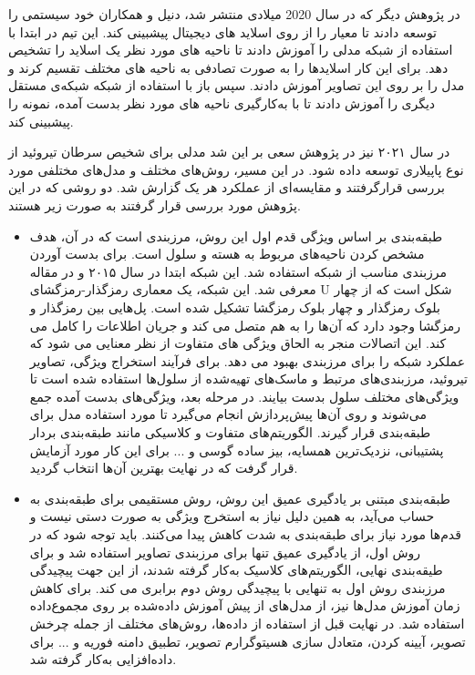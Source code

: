 در پژوهش دیگر \cite{elliott2020application} که در سال 2020 میلادی منتشر شد، دنیل و همکاران خود سیستمی را توسعه دادند تا معیار  را از روی اسلاید های دیجیتال پیشبینی کند. این تیم در ابتدا با استفاده از شبکه  مدلی را آموزش دادند تا ناحیه های مورد نظر یک اسلاید را تشخیص دهد. برای این کار اسلایدها را به صورت تصادفی به ناحیه های مختلف تقسیم کرند و مدل را بر روی این تصاویر آموزش دادند.
سپس باز با استفاده از شبکه  شبکه‌ی مستقل دیگری را آموزش دادند تا با به‌کارگیری ناحیه های مورد نظر بدست آمده،  نمونه را پیشبینی کند.



در سال ۲۰۲۱ نیز در پژوهش \cite{bohland2021machine} سعی بر این شد مدلی برای شخیص سرطان تیروئید از نوع پاپیلاری توسعه داده شود.
در این مسیر، روش‌های مختلف و مدل‌های مختلفی مورد بررسی قرارگرفتند و مقایسه‌ای از عملکرد هر یک گزارش شد.
دو روشی که در این پژوهش مورد بررسی قرار گرفتند به صورت زیر هستند.
\begin{itemize}
    \item طبقه‌بندی بر اساس ویژگی\newline
    قدم اول این روش، مرزبندی است که در آن، هدف مشخص کردن ناحیه‌های مربوط به هسته و سلول است.
    برای بدست آوردن مرزبندی مناسب از شبکه  استفاده شد. این شبکه ابتدا در سال ۲۰۱۵ و در مقاله \cite{ronneberger2015u} معرفی شد.
    این شبکه، یک معماری رمزگذار-رمزگشای U شکل است که از چهار بلوک رمزگذار و چهار بلوک رمزگشا تشکیل شده است.
    پل‌هایی بین رمزگذار و رمزگشا وجود دارد که آن‌ها را به هم متصل می کند و جریان اطلاعات را کامل می کند.
    این اتصالات منجر به الحاق ویژگی های متفاوت از نظر معنایی می شود که عملکرد شبکه را برای مرزبندی بهبود می دهد.
    برای فرآیند استخراج ویژگی، تصاویر تیروئید، مرزبندی‌های مرتبط و ماسک‌های تهیه‌شده از سلول‌ها استفاده شده است تا ویژگی‌های مختلف سلول بدست بیایند.
    در مرحله بعد، ویژگی‌های بدست آمده جمع می‌شوند و روی آن‌ها پیش‌پردازش انجام می‌گیرد تا مورد استفاده مدل برای طبقه‌بندی قرار گیرند. الگوریتم‌های متفاوت و کلاسیکی مانند طبقه‌بندی بردار پشتیبانی، نزدیک‌ترین همسایه، بیز ساده گوسی و ... برای این کار مورد آزمایش قرار گرفت که در نهایت بهترین آن‌ها انتخاب گردید.

    \item طبقه‌بندی مبتنی بر یادگیری عمیق\newline
    این روش، روش مستقیمی برای طبقه‌بندی به حساب می‌آید، به همین دلیل نیاز به استخرج ویژگی به صورت دستی نیست و قدم‌ها مورد نیاز برای طبقه‌بندی به شدت کاهش پیدا می‌کنند.
    باید توجه شود که در روش اول، از یادگیری عمیق تنها برای مرزبندی تصاویر استفاده شد و برای طیقه‌بندی نهایی، الگوریتم‌های کلاسیک به‌کار گرفته شدند، از این جهت پیچیدگی مرزبندی روش اول به تنهایی با پیچیدگی روش دوم برابری می کند.
    برای کاهش زمان آموزش مدل‌ها نیز، از مدل‌های از پیش آموزش داده‌شده بر روی مجموع‌داده \cite{deng2009imagenet} استفاده شد. در نهایت قبل از استفاده از داده‌ها، روش‌های مختلف از جمله چرخش تصویر، آیینه کردن، متعادل سازی هسیتوگرارم تصویر، تطبیق دامنه فوریه و ... برای داده‌افزایی به‌کار گرفته شد.
     

\end{itemize}
